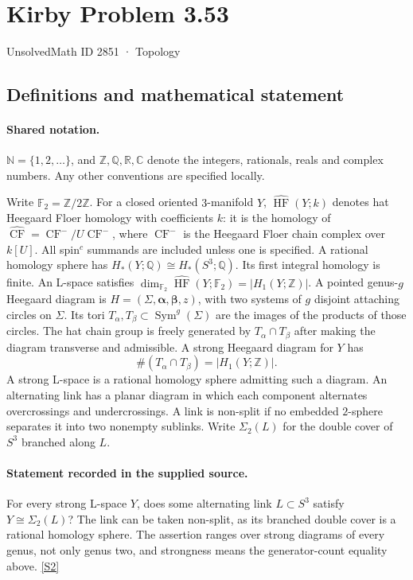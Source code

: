 \documentclass[11pt]{article}
\newcommand{\sref}[2]{\hyperlink{source:#1:#2}{[S#2]}}
\begin{document}
\setcounter{section}{2850}
\section{Kirby Problem 3.53}\label{2851}
{\small\sffamily UnsolvedMath ID 2851 · Topology}
\subsection{Definitions and mathematical statement}

\paragraph{Shared notation.}$\mathbb N=\{1,2,\ldots\}$, and $\mathbb Z,\mathbb Q,\mathbb R,\mathbb C$ denote the integers, rationals, reals and complex numbers. Any other conventions are specified locally.


Write $\mathbb F_2=\mathbb Z/2\mathbb Z$. For a closed oriented $3$-manifold $Y$, $\widehat{\operatorname{HF}}(Y;k)$ denotes hat Heegaard Floer homology with coefficients $k$: it is the homology of $\widehat{\operatorname{CF}}=\operatorname{CF}^-/U\operatorname{CF}^-$, where $\operatorname{CF}^-$ is the Heegaard Floer chain complex over $k[U]$. All spin$^c$ summands are included unless one is specified. A rational homology sphere has $H_*(Y;\mathbb Q)\cong H_*(S^3;\mathbb Q)$. Its first integral homology is finite. An L-space satisfies $\dim_{\mathbb F_2}\widehat{\operatorname{HF}}(Y;\mathbb F_2)=|H_1(Y;\mathbb Z)|$. A pointed genus-$g$ Heegaard diagram is $H=(\Sigma,\boldsymbol\alpha,\boldsymbol\beta,z)$, with two systems of $g$ disjoint attaching circles on $\Sigma$. Its tori $T_\alpha,T_\beta\subset\operatorname{Sym}^g(\Sigma)$ are the images of the products of those circles. The hat chain group is freely generated by $T_\alpha\cap T_\beta$ after making the diagram transverse and admissible. A strong Heegaard diagram for $Y$ has
\[
\#(T_\alpha\cap T_\beta)=|H_1(Y;\mathbb Z)|.
\]
A strong L-space is a rational homology sphere admitting such a diagram. An alternating link has a planar diagram in which each component alternates overcrossings and undercrossings. A link is non-split if no embedded $2$-sphere separates it into two nonempty sublinks. Write $\Sigma_2(L)$ for the double cover of $S^3$ branched along $L$.
\paragraph{Statement recorded in the supplied source.}
For every strong L-space $Y$, does some alternating link $L\subset S^3$ satisfy $Y\cong\Sigma_2(L)$? The link can be taken non-split, as its branched double cover is a rational homology sphere. The assertion ranges over strong diagrams of every genus, not only genus two, and strongness means the generator-count equality above. \sref{2851}{2}
\end{document}
